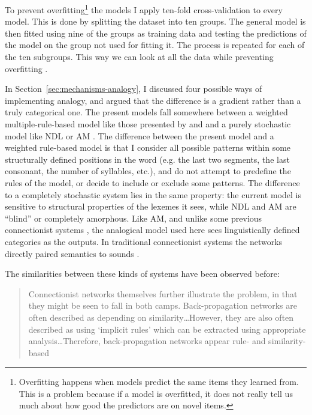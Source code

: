\largerpage
To prevent overfitting\footnote{Overfitting happens when models predict the same items they learned from. This is a problem because if a model is overfitted, it does not really tell us much about how good the predictors are on novel items.} the models I apply ten-fold cross-validation to every model. This is done by splitting the dataset into ten groups. The general model is then fitted using nine of the groups as training data and testing the predictions of the model on the group not used for fitting it. The process is repeated for each of the ten subgroups. This way we can look at all the data while preventing  overfitting \autocite{Kohavi.1995}.\newpage

In Section~\ref{sec:mechanisms-analogy}, I discussed four possible ways of implementing analogy, and argued that the difference is a gradient rather than a truly categorical one. The present models fall somewhere between a weighted multiple-rule-based model like those presented by \textcite{Albright.2003} and \textcite{Albright.2009} and a purely stochastic model like NDL \autocites{Arppe.2014, Baayen.2011, Baayen.2011a} or AM \autocites{Skousen.1989, Skousen.2002, Skousen.2013, Arndt-Lappe.2011, Arndt-Lappe.2014}. The difference between the present model and a weighted rule-based model is that I consider all possible patterns within some structurally defined positions in the word (e.g. the last two segments, the last consonant, the number of syllables, etc.), and do not attempt to predefine the rules of the model, or decide to include or exclude some patterns. The difference to a completely stochastic system lies in the same property: the current model is sensitive to structural properties of the lexemes it sees, while NDL and AM are ``blind'' or completely amorphous. Like AM, and unlike some previous connectionist systems \autocite{Bechtel.2002, Churchland.1989, McClelland.1986, Rumelhart.1986}, the analogical model used here sees linguistically defined categories as the outputs. In traditional connectionist systems the networks directly paired semantics to sounds \autocite{Matthews.2005}.

The similarities between these kinds of systems have been observed before:

\begin{quotation}
Connectionist  networks  themselves  further  illustrate  the  problem,  in  that  they might be seen to fall in both camps. Back-propagation networks are often described as  depending  on  similarity\dots  However,  they  are  also often described as using ‘implicit rules’ which can be extracted using appropriate analysis\dots Therefore, back-propagation networks appear rule- and similarity-based \autocite[200]{Hahn.1998}
\end{quotation}

